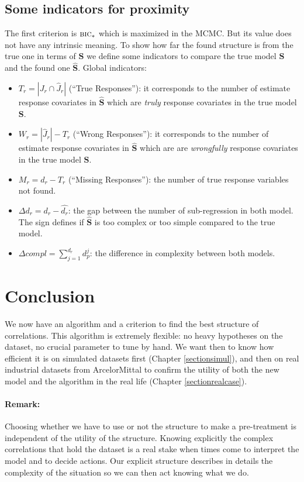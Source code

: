 \documentclass[12pt,a4paper]{report}
\begin{document}
		\subsection{Some indicators for proximity} \label{sectioncompZ}
		The first criterion is $\mbox{{\sc bic}}_*$ which is maximized in the MCMC. But its value does not have any intrinsic meaning. To show how far the found structure is from the true one in terms of $\boldsymbol{S}$ we define some indicators to compare the true model $\boldsymbol{S}$ and the found one $\hat{\boldsymbol{S}}$.
			Global indicators:
			\begin{itemize}
				\item $T_r=|J_r \cap \hat{J}_r|$ (``True Responses''): it corresponds to the number of estimate response covariates in $\hat{\boldsymbol{S}}$ which are {\it truly} response covariates in the true model $\boldsymbol{S}$.
				\item $W_r=|\hat{J}_r|-T_r$ (``Wrong Responses''): it corresponds to the number of estimate response covariates in $\hat{\boldsymbol{S}}$ which are are {\it wrongfully} response covariates in the true model $\boldsymbol{S}$.
				\item $M_r=d_r-T_r$ (``Missing Responses''): the number of true response variables not found.
				\item $\Delta d_r=d_r-\hat{d_r}$: the gap between the number of sub-regression in both model. The sign defines if $\hat{\boldsymbol{S}}$ is too complex or too simple compared to the true model.
				\item $\Delta compl=\sum_{j=1}^{d_r}d_p^j$: the difference in complexity between both models.
			\end{itemize}
			
\section{Conclusion} We now have an algorithm and a criterion to find the best structure of correlations. This algorithm is extremely flexible: no heavy hypotheses on the dataset, no crucial parameter to tune by hand. We want then to know how efficient it is on simulated datasets first (Chapter \ref{sectionsimul}), and then on real industrial datasets from ArcelorMittal to confirm the utility of both the new model and the algorithm in the real life (Chapter \ref{sectionrealcase}).	
		\paragraph{Remark:} Choosing whether we have to use or not the structure to make a pre-treatment is independent of the utility of the structure. Knowing explicitly the complex correlations that hold the dataset is a real stake when times come to interpret the model and to decide actions. Our explicit structure describes in details the complexity of the situation so we can then act knowing what we do. 		
\end{document}
